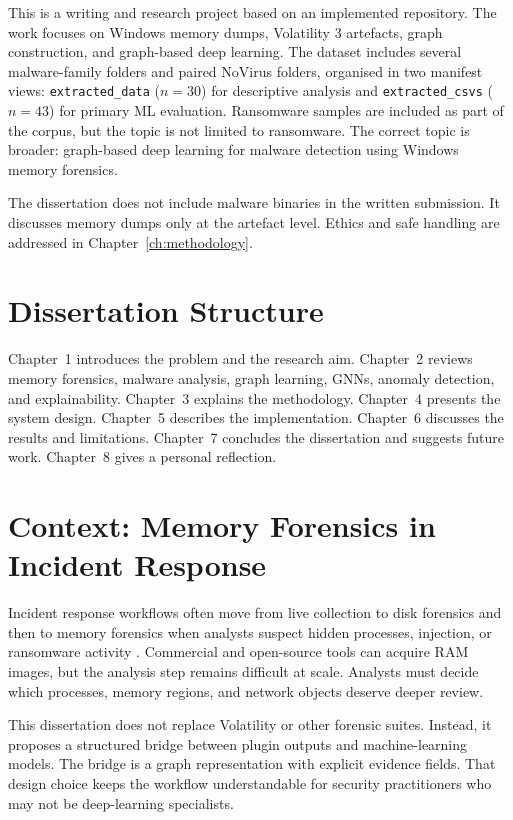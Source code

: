 This is a writing and research project based on an implemented repository. The work focuses on Windows memory dumps, Volatility 3 artefacts, graph construction, and graph-based deep learning. The dataset includes several malware-family folders and paired NoVirus folders, organised in two manifest views: \texttt{extracted\_data} ($n{=}30$) for descriptive analysis and \texttt{extracted\_csvs} ($n{=}43$) for primary ML evaluation. Ransomware samples are included as part of the corpus, but the topic is not limited to ransomware. The correct topic is broader: graph-based deep learning for malware detection using Windows memory forensics.

The dissertation does not include malware binaries in the written submission. It discusses memory dumps only at the artefact level. Ethics and safe handling are addressed in Chapter~\ref{ch:methodology}.

\section{Dissertation Structure}

Chapter~1 introduces the problem and the research aim. Chapter~2 reviews memory forensics, malware analysis, graph learning, GNNs, anomaly detection, and explainability. Chapter~3 explains the methodology. Chapter~4 presents the system design. Chapter~5 describes the implementation. Chapter~6 discusses the results and limitations. Chapter~7 concludes the dissertation and suggests future work. Chapter~8 gives a personal reflection.

\section{Context: Memory Forensics in Incident Response}

Incident response workflows often move from live collection to disk forensics and then to memory forensics when analysts suspect hidden processes, injection, or ransomware activity \cite{nist2012sp80061}. Commercial and open-source tools can acquire RAM images, but the analysis step remains difficult at scale. Analysts must decide which processes, memory regions, and network objects deserve deeper review.

This dissertation does not replace Volatility or other forensic suites. Instead, it proposes a structured bridge between plugin outputs and machine-learning models. The bridge is a graph representation with explicit evidence fields. That design choice keeps the workflow understandable for security practitioners who may not be deep-learning specialists.

